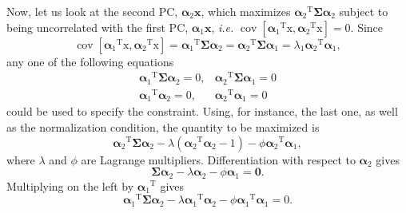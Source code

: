 Now, let us look at the second PC, $\boldsymbol{\alpha}_2\mathbf{x}$, which maximizes ${\boldsymbol{\alpha}_2}^{\operatorname{T}}\boldsymbol{\Sigma} \boldsymbol{\alpha}_2$ subject to being uncorrelated with the first PC, $\boldsymbol{\alpha}_1\mathbf{x}$, \textit{i.e.} $\operatorname{cov}\left[{\boldsymbol{\alpha}_1}^{\operatorname{T}} \mathrm{x}, {\boldsymbol{\alpha}_2}^{\operatorname{T}} \mathrm{x}\right]=0$. Since
\begin{equation}
	\operatorname{cov}\left[{\boldsymbol{\alpha}_1}^{\operatorname{T}} \mathrm{x}, {\boldsymbol{\alpha}_2}^{\operatorname{T}} \mathrm{x}\right]={\boldsymbol{\alpha}_1}^{\operatorname{T}} \boldsymbol{\Sigma} \boldsymbol{\alpha}_2={\boldsymbol{\alpha}_2}^{\operatorname{T}} \boldsymbol{\Sigma} \boldsymbol{\alpha}_1=\lambda_1 {\boldsymbol{\alpha}_2}^{\operatorname{T}} \boldsymbol{\alpha}_1,
\end{equation}
any one of the following equations
\begin{equation}
\begin{array}{rr}
	{\boldsymbol{\alpha}_1}^{\operatorname{T}} \boldsymbol{\Sigma} \boldsymbol{\alpha}_2=0, & {\boldsymbol{\alpha}_2}^{\operatorname{T}} \boldsymbol{\Sigma} \boldsymbol{\alpha}_1=0 \\
	{\boldsymbol{\alpha}_1}^{\operatorname{T}} \boldsymbol{\alpha}_2=0, & {\boldsymbol{\alpha}_2}^{\operatorname{T}} \boldsymbol{\alpha}_1=0
\end{array}
\end{equation}
could be used to specify the constraint. Using, for instance, the last one, as well as the normalization condition, the quantity to be maximized is
\begin{equation}
	{\boldsymbol{\alpha}_2}^{\operatorname{T}} \boldsymbol{\Sigma} \boldsymbol{\alpha}_2-\lambda\left({\boldsymbol{\alpha}_2}^{\operatorname{T}} \boldsymbol{\alpha}_2-1\right)-\phi {\boldsymbol{\alpha}_2}^{\operatorname{T}} \boldsymbol{\alpha}_1,
\end{equation}
where $\lambda$ and $\phi$ are Lagrange multipliers. Differentiation with respect to $\boldsymbol{\alpha}_2$ gives
\begin{equation}
	\boldsymbol{\Sigma} \boldsymbol{\alpha}_2-\lambda \boldsymbol{\alpha}_2-\phi \boldsymbol{\alpha}_1=\mathbf{0}.
\end{equation}
Multiplying on the left by ${\boldsymbol{\alpha}_1}^{\operatorname{T}}$ gives
\begin{equation}
	{\boldsymbol{\alpha}_1}^{\operatorname{T}} \boldsymbol{\Sigma} \boldsymbol{\alpha}_2-\lambda {\boldsymbol{\alpha}_1}^{\operatorname{T}} \boldsymbol{\alpha}_2-\phi {\boldsymbol{\alpha}_1}^{\operatorname{T}} \boldsymbol{\alpha}_1=0.
\end{equation}
